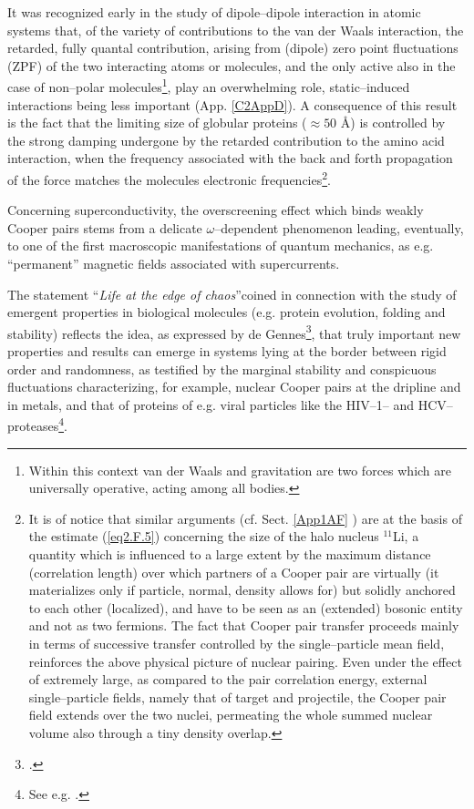\begin{subappendices}
It was recognized early in the study of dipole--dipole interaction in atomic systems that, of the variety of contributions to the van der Waals interaction, the retarded, fully quantal contribution, arising from (dipole) zero point fluctuations (ZPF) of the two interacting atoms or molecules, and the only active also in the case of non--polar molecules\footnote{Within this context van der Waals and gravitation are two forces which are universally operative, acting among all bodies.}, play an overwhelming role, static--induced interactions being less important (App. \ref{C2AppD}). A consequence of this result is the fact that the limiting size of globular proteins ($\approx 50$ \AA) is controlled by the strong damping undergone by the retarded contribution to the amino acid interaction, when the frequency associated with the  back and forth propagation of the force  matches the molecules electronic frequencies\footnote{It is of notice that similar arguments (cf. Sect. \ref{App1AF} ) are at the basis of the estimate (\ref{eq2.F.5}) concerning the size of the halo nucleus $^{11}$Li, a quantity which is influenced to a large extent by the maximum distance (correlation length) over which  partners of a Cooper pair are virtually (it materializes only if particle, normal, density allows for) but solidly anchored to each other (localized), and have to be seen as an (extended) bosonic entity and not as two fermions. The fact that Cooper pair transfer proceeds mainly in terms of successive transfer controlled by the single--particle mean field, reinforces the above physical picture of nuclear pairing. Even under the effect of extremely large, as compared to the pair correlation energy, external single--particle fields, namely that of target and projectile, the Cooper pair field extends over the two nuclei, permeating the whole summed nuclear volume also through a tiny density overlap.}.


Concerning superconductivity, the overscreening effect which binds weakly Cooper pairs stems from a delicate $\omega$--dependent phenomenon leading, eventually, to one of the first macroscopic manifestations of quantum mechanics, as e.g. ``permanent'' magnetic fields associated with supercurrents.

The statement ``\textit{Life at the edge of chaos}''coined in connection with the study of emergent properties in biological molecules (e.g. protein evolution, folding and stability) reflects the idea, as expressed by de Gennes\footnote{\cite{deGennes:94}.}, that truly important new properties and results can emerge in systems lying at the border between rigid order and randomness, as testified by the marginal stability and conspicuous fluctuations characterizing, for example, nuclear Cooper pairs at the dripline and in metals, and that of proteins of e.g.  viral particles like the HIV--1-- and HCV--proteases\footnote{See e.g. \cite{Broglia:13b}.}.



\end{subappendices}
